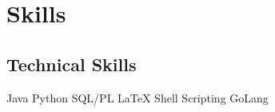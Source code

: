 \documentclass[]{openfont}
\begin{document}
\begin{minipage}[t]{0.33\textwidth}





\section{Skills}
\subsection{Technical Skills}

\textbullet{}Java
\textbullet{}Python
\textbullet{}SQL/PL 
\textbullet{}\LaTeX \newline
\textbullet{}Shell Scripting
\textbullet{}GoLang


\end{minipage}
\end{document}

